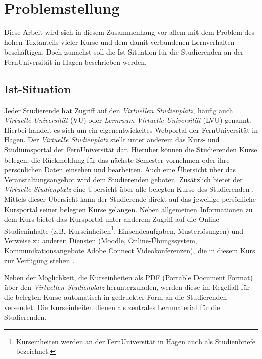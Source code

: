 \section{Problemstellung}
Diese Arbeit wird sich in diesem Zusammenhang vor allem mit dem Problem des hohen Textanteils vieler Kurse und dem damit verbundenen Lernverhalten beschäftigen. Doch zunächst soll die Ist-Situation für die Studierenden an der FernUniversität in Hagen beschrieben werden.

\subsection{Ist-Situation}
Jeder Studierende hat Zugriff auf den \textit{Virtuellen Studienplatz}, häufig auch \textit{Virtuelle Universität} (VU) oder \textit{Lernraum Virtuelle Universität} (LVU) genannt. Hierbei handelt es sich um ein eigenentwickeltes Webportal der FernUniversität in Hagen. Der \textit{Virtuelle Studienplatz} stellt unter anderem das Kurs- und Studiumsportal der FernUniversität dar. Hierüber können die Studierenden Kurse belegen, die Rückmeldung für das nächste Semester vornehmen oder ihre persönlichen Daten einsehen und bearbeiten. Auch eine Übersicht über das Veranstaltungsangebot wird dem Studierenden geboten. Zusätzlich bietet der \textit{Virtuelle Studienplatz} eine Übersicht über alle belegten Kurse des Studierenden \citep{fernuniversitaet2018vu}. Mittels dieser Übersicht kann der Studierende direkt auf das jeweilige persönliche Kursportal seiner belegten Kurse gelangen. Neben allgemeinen Informationen zu dem Kurs bietet das Kursportal unter anderem Zugriff auf die Online-Studieninhalte (z.B. Kurseinheiten\footnote{Kurseinheiten werden an der FernUniversität in Hagen auch als Studienbriefe bezeichnet.}, Einsendeaufgaben, Musterlösungen) und Verweise zu anderen Diensten (Moodle, Online-Übungssystem, Kommunikationsangebote Adobe Connect Videokonferenzen), die in diesem Kurs zur Verfügung stehen \citep{fernuniversitaet2018kurs}.

Neben der Möglichkeit, die Kurseinheiten als PDF (Portable Document Format) über den \textit{Virtuellen Studienplatz} herunterzuladen, werden diese im Regelfall für die belegten Kurse automatisch in gedruckter Form an die Studierenden versendet. Die Kurseinheiten dienen als zentrales Lernmaterial für die Studierenden.


